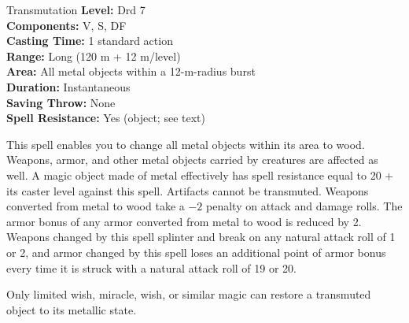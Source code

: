 {Transmutation}
{
	\textbf{Level:}
	Drd 7\\
	\textbf{Components:}
	V, S, DF\\
	\textbf{Casting Time:}
	1 standard action\\
	\textbf{Range:}
	Long (120 m + 12 m/level)\\
	\textbf{Area:}
	All metal objects within a 12-m-radius burst\\
	\textbf{Duration:}
	Instantaneous\\
	\textbf{Saving Throw:}
	None\\
	\textbf{Spell Resistance:}
	Yes (object; see text)\\
}
{
	This spell enables you to change all metal objects within its area to wood. Weapons, armor, and other metal objects carried by creatures are affected as well. A magic object made of metal effectively has spell resistance equal to 20 + its caster level against this spell. Artifacts cannot be transmuted. Weapons converted from metal to wood take a $-2$ penalty on attack and damage rolls. The armor bonus of any armor converted from metal to wood is reduced by 2. Weapons changed by this spell splinter and break on any natural attack roll of 1 or 2, and armor changed by this spell loses an additional point of armor bonus every time it is struck with a natural attack roll of 19 or 20.

	Only limited wish, miracle, wish, or similar magic can restore a transmuted object to its metallic state.

}
